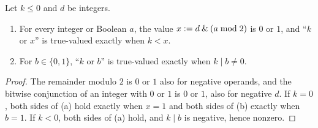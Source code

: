 \begin{lemma}\label{cert:lem:phase-guards}
Let $k\le 0$ and $d$ be integers.
\begin{enumerate}[label=(\alph*)]
\item For every integer or Boolean $a$, the value $x\mathrel{:=} d\mathbin{\&}(a\bmod 2)$ is
$0$ or $1$, and ``$k$ or $x$'' is true-valued exactly when $k<x$.
\item For $b\in\{0,1\}$, ``$k$ or $b$'' is true-valued exactly when
$k\mathbin{|}b\neq 0$.
\end{enumerate}
\end{lemma}
\begin{proof}
The remainder modulo $2$ is $0$ or $1$ also for negative operands, and the bitwise
conjunction of an integer with $0$ or $1$ is $0$ or $1$, also for negative $d$. If $k=0$,
both sides of (a) hold exactly when $x=1$ and both sides of (b) exactly when $b=1$. If
$k<0$, both sides of (a) hold, and $k\mathbin{|}b$ is negative, hence nonzero.
\end{proof}

